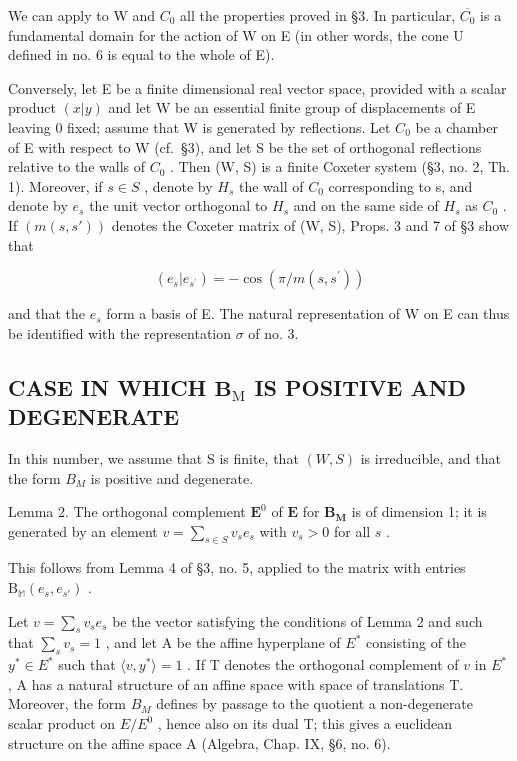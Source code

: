 We can apply to W and \(C_{0}\) all the properties proved in §3. In particular, \(\overline{C_{0}}\) is a fundamental domain for the action of W on E (in other words, the cone U defined in no. 6 is equal to the whole of E).

Conversely, let E be a finite dimensional real vector space, provided with a scalar product \((x|y)\) and let W be an essential finite group of displacements of E leaving 0 fixed; assume that W is generated by reflections. Let \(C_{0}\) be a chamber of E with respect to W (cf.~§3), and let S be the set of orthogonal reflections relative to the walls of \(C_{0}\) . Then (W, S) is a finite Coxeter system (§3, no. 2, Th. 1). Moreover, if \(s \in S\) , denote by \(H_{s}\) the wall of \(C_{0}\) corresponding to s, and denote by \(e_{s}\) the unit vector orthogonal to \(H_{s}\) and on the same side of \(H_{s}\) as \(C_{0}\) . If \((m(s, s'))\) denotes the Coxeter matrix of (W, S), Props. 3 and 7 of §3 show that

\[
(e _ {s} | e _ {s ^ {\prime}}) = - \cos (\pi / m (s, s ^ {\prime}))
\]

and that the \(e_{s}\) form a basis of E. The natural representation of W on E can thus be identified with the representation \(\sigma\) of no. 3.

\subsection{\texorpdfstring{CASE IN WHICH \(\mathbf{B}_{\mathrm{M}}\) IS POSITIVE AND DEGENERATE}{CASE IN WHICH B\_M IS POSITIVE AND DEGENERATE}}

In this number, we assume that S is finite, that \((W, S)\) is irreducible, and that the form \(B_{M}\) is positive and degenerate.

Lemma 2. The orthogonal complement \(\mathbf{E}^0\) of \(\mathbf{E}\) for \(\mathbf{B}_{\mathbf{M}}\) is of dimension 1; it is generated by an element \(v = \sum_{s\in S}v_s e_s\) with \(v_{s} > 0\) for all \(s\) .

This follows from Lemma 4 of §3, no. 5, applied to the matrix with entries \(\mathrm{B}_{\mathbb{M}}(e_s, e_{s'})\) .

Let \(v = \sum_{s} v_s e_s\) be the vector satisfying the conditions of Lemma 2 and such that \(\sum_{s} v_s = 1\) , and let A be the affine hyperplane of \(E^*\) consisting of the \(y^* \in E^*\) such that \(\langle v, y^* \rangle = 1\) . If T denotes the orthogonal complement of \(v\) in \(E^*\) , A has a natural structure of an affine space with space of translations T. Moreover, the form \(B_M\) defines by passage to the quotient a non-degenerate scalar product on \(E/E^0\) , hence also on its dual T; this gives a euclidean structure on the affine space A (Algebra, Chap. IX, §6, no. 6).

